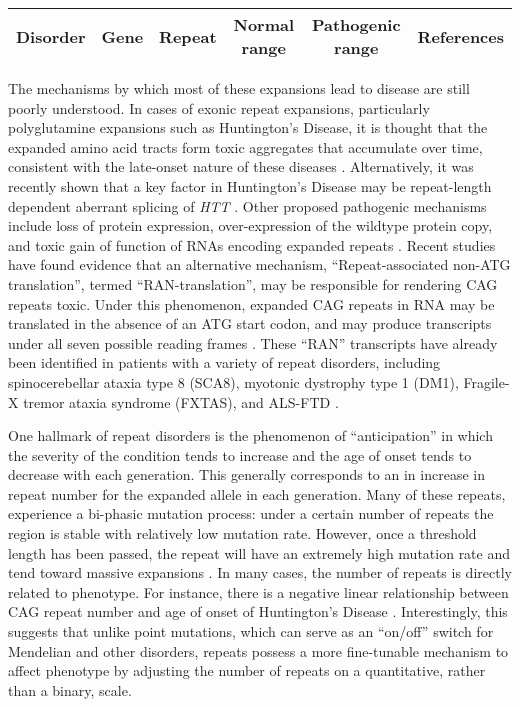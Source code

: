 \begin{table}
\label{tab:intro1}
\begin{tabular}{c c c c c c}
\hline
Disorder & Gene & Repeat & Normal range & Pathogenic range & References \\
\hline
\hline
\end{tabular}
\end{table}

The mechanisms by which most of these expansions lead to disease are still poorly understood. In cases of exonic repeat expansions, particularly polyglutamine expansions such as Huntington's Disease, it is thought that the expanded amino acid tracts form toxic aggregates that accumulate over time, consistent with the late-onset nature of these diseases \cite{MichalikVanBroeckhoven2003}. Alternatively, it was recently shown that a key factor in Huntington's Disease may be repeat-length dependent aberrant splicing of \emph{HTT} \cite{SathasivamNeuederGipsonEtAl2013}. Other proposed pathogenic mechanisms include loss of protein expression, over-expression of the wildtype protein copy, and toxic gain of function of RNAs encoding expanded repeats \cite{Pearson2011}. Recent studies have found evidence that an alternative mechanism, ``Repeat-associated non-ATG translation'', termed ``RAN-translation'', may be responsible for rendering CAG repeats toxic. Under this phenomenon, expanded CAG repeats in RNA may be translated in the absence of an ATG start codon, and may produce transcripts under all seven possible reading frames \cite{Pearson2011}. These ``RAN'' transcripts have already been identified in patients with a variety of repeat disorders, including spinocerebellar ataxia type 8 (SCA8), myotonic dystrophy type 1 (DM1), Fragile-X tremor ataxia syndrome (FXTAS), and ALS-FTD \cite{ClearyRanum2014}.

One hallmark of repeat disorders is the phenomenon of ``anticipation'' in which the severity of the condition tends to increase and the age of onset tends to decrease with each generation. This generally corresponds to an in increase in repeat number for the expanded allele in each generation. Many of these repeats, experience a bi-phasic mutation process: under a certain number of repeats the region is stable with relatively low mutation rate. However, once a threshold length has been passed, the repeat will have an extremely high mutation rate and tend toward massive expansions \cite{BourgeoisCoffeyRiveraEtAl2009}. In many cases, the number of repeats is directly related to phenotype. For instance, there is a negative linear relationship between CAG repeat number and age of onset of Huntington's Disease \cite{Rubinsztein2002}. Interestingly, this suggests that unlike point mutations, which can serve as an ``on/off'' switch for Mendelian and other disorders, repeats possess a more fine-tunable mechanism to affect phenotype by adjusting the number of repeats on a quantitative, rather than a binary, scale.

